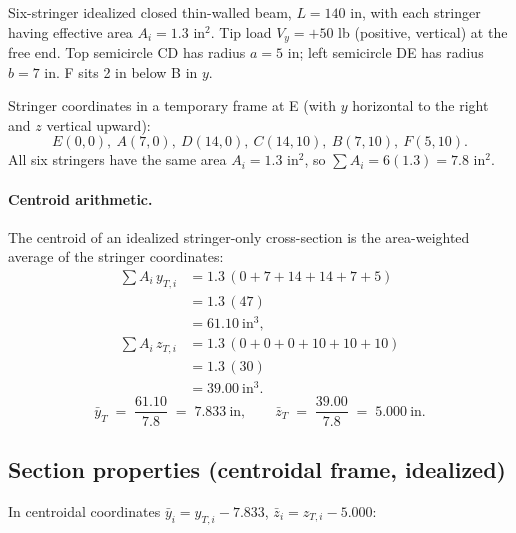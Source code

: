\documentclass[11pt]{article}
\begin{document}
Six-stringer idealized closed thin-walled beam, $L = 140$ in, with each stringer having effective area $A_i = 1.3$ in$^2$. Tip load $V_y = +50$ lb (positive, vertical) at the free end. Top semicircle CD has radius $a = 5$ in; left semicircle DE has radius $b = 7$ in. F sits 2 in below B in $y$.

Stringer coordinates in a temporary frame at E (with $y$ horizontal to the right and $z$ vertical upward):
\[
E(0,0),\ A(7,0),\ D(14,0),\ C(14,10),\ B(7,10),\ F(5,10).
\]
All six stringers have the same area $A_i = 1.3$ in$^2$, so $\sum A_i = 6(1.3) = 7.8$ in$^2$.

\paragraph{Centroid arithmetic.} The centroid of an idealized stringer-only cross-section is the area-weighted average of the stringer coordinates:
\begin{align*}
\sum A_i\,y_{T,i} &= 1.3\,(0 + 7 + 14 + 14 + 7 + 5)\\
                  &= 1.3\,(47)\\
                  &= 61.10\ \text{in}^3,\\[2pt]
\sum A_i\,z_{T,i} &= 1.3\,(0 + 0 + 0 + 10 + 10 + 10)\\
                  &= 1.3\,(30)\\
                  &= 39.00\ \text{in}^3.
\end{align*}
\[
\bar y_T \;=\; \frac{61.10}{7.8} \;=\; 7.833\ \text{in},\qquad
\bar z_T \;=\; \frac{39.00}{7.8} \;=\; 5.000\ \text{in}.
\]

\subsection*{Section properties (centroidal frame, idealized)}

In centroidal coordinates $\bar y_i = y_{T,i} - 7.833$, $\bar z_i = z_{T,i} - 5.000$:
\end{document}
